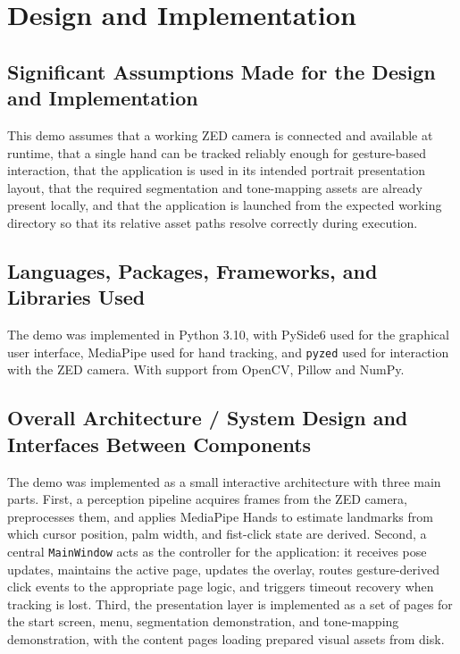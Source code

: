 ﻿\documentclass[11pt,a4paper]{article}
\begin{document}
\section{Design and Implementation}

\subsection{Significant Assumptions Made for the Design and Implementation}

This demo assumes that a working ZED camera is connected and available at runtime, that a
single hand can be tracked reliably enough for gesture-based interaction, that
the application is used in its intended portrait presentation layout, that the
required segmentation and tone-mapping assets are already present locally, and
that the application is launched from the expected working directory so that
its relative asset paths resolve correctly during execution.

\subsection{Languages, Packages, Frameworks, and Libraries Used}

The demo was implemented in Python 3.10, with PySide6 used for the
graphical user interface, MediaPipe used for hand tracking, and
\texttt{pyzed} used for interaction with the ZED camera. 
With support from OpenCV, Pillow and NumPy.

\subsection{Overall Architecture / System Design and Interfaces Between Components}

The demo was implemented as a small interactive architecture with
three main parts. First, a perception pipeline acquires frames from the ZED
camera, preprocesses them, and applies MediaPipe Hands to estimate landmarks
from which cursor position, palm width, and fist-click state are derived.
Second, a central \texttt{MainWindow} acts as the controller for the
application: it receives pose updates, maintains the active page, updates the
overlay, routes gesture-derived click events to the appropriate page logic,
and triggers timeout recovery when tracking is lost. Third, the presentation
layer is implemented as a set of pages for the start screen, menu,
segmentation demonstration, and tone-mapping demonstration, with the content
pages loading prepared visual assets from disk.
\end{document}
